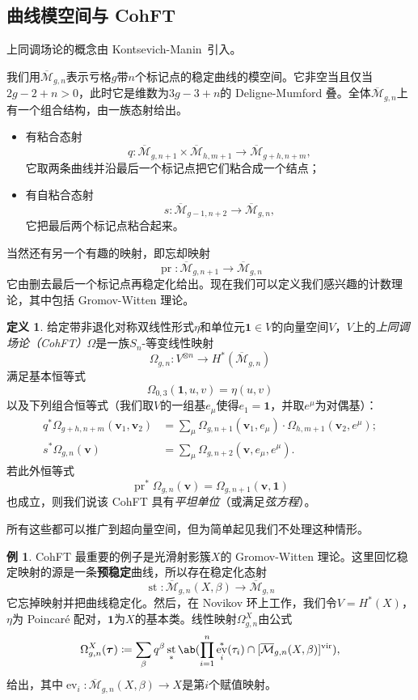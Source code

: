 \documentclass{amsart}
\theoremstyle{definition}
\newtheorem{defn}[thm]{定义}
\newtheorem{exm}[thm]{例}
\theoremstyle{remark}
\theoremstyle{plain}
\theoremstyle{definition}
\theoremstyle{remark}
\newcommand{\Mbar}{\overline{\mathcal{M}}}
\newcommand{\mbf}[1]{\mathbf{#1}}
\newcommand{\bv}{\mbf{v}}
\newcommand{\btau}{\bm{\tau}}
\newcommand{\mr}[1]{\mathrm{#1}}
\newcommand{\1}{\mathbf{1}}
\newcommand{\2}{\mathbf{2}}
\newcommand{\3}{\mathbf{3}}
\newcommand{\vir}{\mr{vir}}
\DeclareMathOperator{\ev}{ev}
\DeclareMathOperator{\st}{st}
\DeclareMathOperator{\pr}{pr}
\begin{document}
\subsection{曲线模空间与 CohFT}%
\label{sub:Moduli of curves and CohFTs}

上同调场论的概念由 Kontsevich-Manin~\cite{KM1994}引入。

我们用$\Mbar_{g,n}$表示亏格$g$带$n$个标记点的稳定曲线的模空间。它非空当且仅当$2g-2+n > 0$，此时它是维数为$3g-3+n$的 Deligne-Mumford 叠。全体$\Mbar_{g,n}$上有一个组合结构，由一族态射给出。
\begin{itemize}
    \item 有粘合态射
        \[q \colon \Mbar_{g,n+1} \times \Mbar_{h, m+1} \to \Mbar_{g+h,n+m}, \]
        它取两条曲线并沿最后一个标记点把它们粘合成一个结点；
    \item 有自粘合态射\[s \colon \Mbar_{g-1,n+2} \to \Mbar_{g,n},\]
        它把最后两个标记点粘合起来。
\end{itemize}
当然还有另一个有趣的映射，即忘却映射
\[ \pr \colon \Mbar_{g,n+1} \to \Mbar_{g,n} \]
它由删去最后一个标记点再稳定化给出。现在我们可以定义我们感兴趣的计数理论，其中包括 Gromov-Witten 理论。

\begin{defn}
    给定带非退化对称双线性形式$\eta$和单位元$\1 \in V$的向量空间$V$，$V$上的\textit{上同调场论（CohFT）}$\Omega$是一族$S_n$-等变线性映射
    \[ \Omega_{g,n} \colon V^{\otimes n} \to H^*(\Mbar_{g,n}) \]
    满足基本恒等式
    \[ \Omega_{0,3}(\1, u,v) = \eta(u,v) \]
    以及下列组合恒等式（我们取$V$的一组基$e_{\mu}$使得$e_1 = \1$，并取$e^{\mu}$为对偶基）：
    \begin{align*}
        q^* \Omega_{g+h,n+m}(\bv_1, \bv_2) &= \sum_{\mu} \Omega_{g,n+1}(\bv_1, e_{\mu}) \cdot \Omega_{h,m+1}(  \bv_2, e^{\mu} ); \\
        s^* \Omega_{g,n}(\bv) &= \sum_{\mu} \Omega_{g,n+2}(\bv, e_{\mu}, e^{\mu}).
    \end{align*}
    若此外恒等式
    \[ \pr^*\Omega_{g,n}(\bv) = \Omega_{g,n+1}(\bv,\1) \]
    也成立，则我们说该 CohFT 具有\textit{平坦单位}（或满足\textit{弦方程}）。
\end{defn}
所有这些都可以推广到超向量空间，但为简单起见我们不处理这种情形。

\begin{exm}
    CohFT 最重要的例子是光滑射影簇$X$的 Gromov-Witten 理论。这里回忆稳定映射的源是一条\textbf{预稳定}曲线，所以存在稳定化态射
    \[ \st \colon \Mbar_{g,n}(X,\beta) \to \Mbar_{g,n} \]
    它忘掉映射并把曲线稳定化。然后，在 Novikov 环上工作，我们令$V = H^*(X)$，$\eta$为 Poincar\'e 配对，$\1$为$X$的基本类。线性映射$\Omega^X_{g,n}$由公式
    \[ \Omega_{g,n}^X(\btau) \coloneqq \sum_{\beta} q^{\beta} \st_* \ab(\prod_{i=1}^n \ev_i^*(\tau_i) \cap [\Mbar_{g,n}(X,\beta)]^{\vir}), \]
    给出，其中$\ev_i \colon \Mbar_{g,n}(X,\beta) \to X$是第$i$个赋值映射。
\end{exm}
\end{document}
